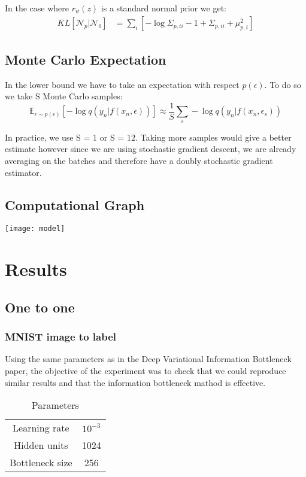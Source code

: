 \documentclass[10pt,oneside,openright]{report}
\begin{document}
In the case where $r_\psi(z)$ is a standard normal prior we get:
\begin{align}
KL[\mathcal{N}_p | \mathcal{N}_0] &= \sum_i[ -\log \Sigma_{p, ii} - 1 + \Sigma_{p, ii}+ \mu_{p, i}^2]
\end{align}

\section{Monte Carlo Expectation}

In the lower bound we have to take an expectation with respect $p(\epsilon)$. To do so we take S Monte Carlo samples: 
 $$ \mathbb{E}_{\epsilon \sim p(\epsilon)}[- \log q(y_{n} |f(x_{n}, \epsilon))] \approx \frac{1}{S}\sum_s - \log q(y_{n} |f(x_{n}, \epsilon_s)) $$
 
 In practice, we use S = 1 or S = 12. Taking more samples would give a better estimate however since we are using stochastic gradient descent, we are already averaging on the batches and therefore have a doubly stochastic gradient estimator.

\section{Computational Graph}
\texttt{[image: model]}


\chapter{Results}
\section{One to one}
\subsection{MNIST image to label}

Using the same parameters as in the Deep Variational Information Bottleneck paper, the objective of the experiment was to check that we could reproduce similar results and that the information bottleneck mathod is effective.

\begin {table}[H]
\begin{center}
\begin{tabular}{ c | c  }
 Learning rate & $10^{-3}$ \\
 Hidden units & 1024 \\
 Bottleneck size & 256 \\
\end{tabular}
\end{center}
\caption{Parameters}
\end {table}
\end{document}
